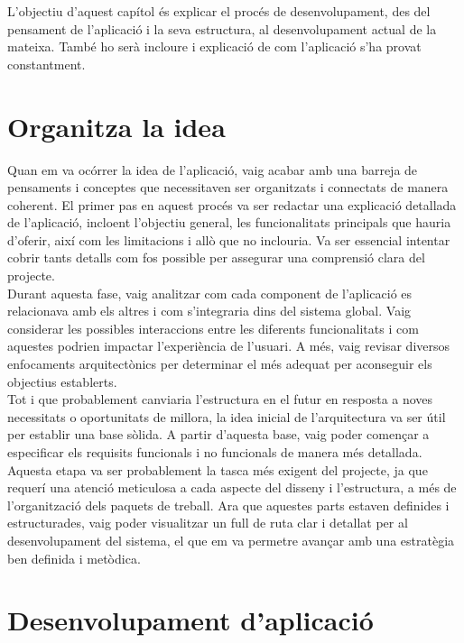 \documentclass[a4paper,12pt,twoside]{ThesisStyle}
\begin{document}
L'objectiu d'aquest capítol és explicar el procés de desenvolupament, des del pensament
de l'aplicació i la seva estructura, al desenvolupament actual de la mateixa. També ho serà
incloure i explicació de com l'aplicació s'ha provat constantment.


\section{Organitza la idea}
\label{sec: Organitza la idea}

Quan em va ocórrer la idea de l'aplicació, vaig acabar amb una barreja de pensaments i conceptes que necessitaven ser organitzats i connectats de manera coherent. El primer pas en aquest procés va ser redactar una explicació detallada de l'aplicació, incloent l'objectiu general, les funcionalitats principals que hauria d'oferir, així com les limitacions i allò que no inclouria. Va ser essencial intentar cobrir tants detalls com fos possible per assegurar una comprensió clara del projecte.\\

Durant aquesta fase, vaig analitzar com cada component de l'aplicació es relacionava amb els altres i com s'integraria dins del sistema global. Vaig considerar les possibles interaccions entre les diferents funcionalitats i com aquestes podrien impactar l'experiència de l'usuari. A més, vaig revisar diversos enfocaments arquitectònics per determinar el més adequat per aconseguir els objectius establerts.\\

Tot i que probablement canviaria l'estructura en el futur en resposta a noves necessitats o oportunitats de millora, la idea inicial de l'arquitectura va ser útil per establir una base sòlida. A partir d'aquesta base, vaig poder començar a especificar els requisits funcionals i no funcionals de manera més detallada. Aquesta etapa va ser probablement la tasca més exigent del projecte, ja que requerí una atenció meticulosa a cada aspecte del disseny i l'estructura, a més de l'organització dels paquets de treball. Ara que aquestes parts estaven definides i estructurades, vaig poder visualitzar un full de ruta clar i detallat per al desenvolupament del sistema, el que em va permetre avançar amb una estratègia ben definida i metòdica.

\section{Desenvolupament d'aplicació}
\label{sec: Desenvolupament d'aplicació}
\end{document}
